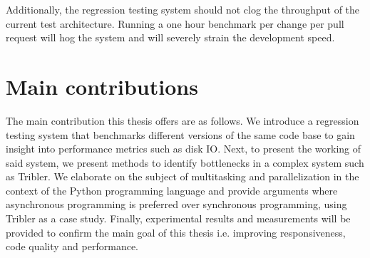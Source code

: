 Additionally, the regression testing system should not clog the throughput of the current test architecture.
Running a one hour benchmark per change per pull request will hog the system and will severely strain the development speed.

\section{Main contributions}
The main contribution this thesis offers are as follows.
We introduce a regression testing system that benchmarks different versions of the same code base to gain insight into performance metrics such as disk IO.
Next, to present the working of said system, we present methods to identify bottlenecks in a complex system such as Tribler. 
We elaborate on the subject of multitasking and parallelization in the context of the Python programming language and provide arguments where asynchronous programming is preferred over synchronous programming, using Tribler as a case study.
Finally, experimental results and measurements will be provided to confirm the main goal of this thesis i.e. improving responsiveness, code quality and performance.
